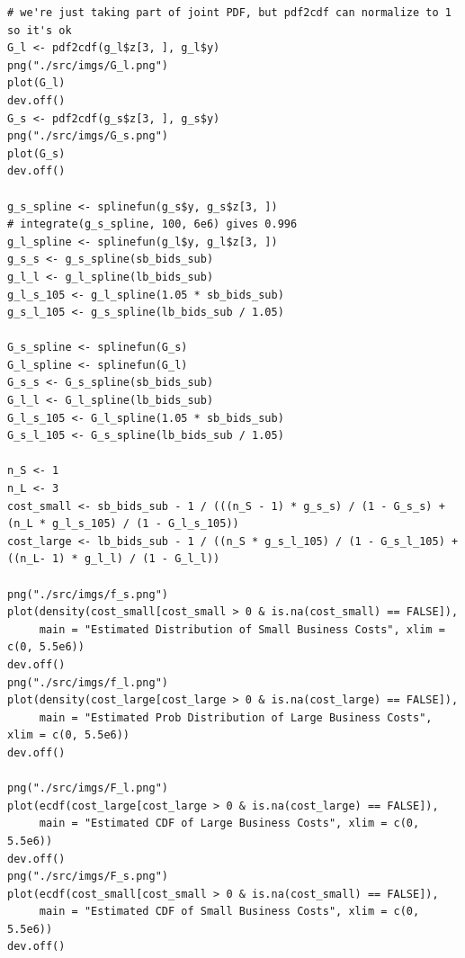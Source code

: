 \begin{lstlisting}
# we're just taking part of joint PDF, but pdf2cdf can normalize to 1 so it's ok
G_l <- pdf2cdf(g_l$z[3, ], g_l$y)
png("./src/imgs/G_l.png")
plot(G_l)
dev.off()
G_s <- pdf2cdf(g_s$z[3, ], g_s$y)
png("./src/imgs/G_s.png")
plot(G_s)
dev.off()

g_s_spline <- splinefun(g_s$y, g_s$z[3, ])
# integrate(g_s_spline, 100, 6e6) gives 0.996
g_l_spline <- splinefun(g_l$y, g_l$z[3, ])
g_s_s <- g_s_spline(sb_bids_sub)
g_l_l <- g_l_spline(lb_bids_sub)
g_l_s_105 <- g_l_spline(1.05 * sb_bids_sub)
g_s_l_105 <- g_s_spline(lb_bids_sub / 1.05)

G_s_spline <- splinefun(G_s)
G_l_spline <- splinefun(G_l)
G_s_s <- G_s_spline(sb_bids_sub)
G_l_l <- G_l_spline(lb_bids_sub)
G_l_s_105 <- G_l_spline(1.05 * sb_bids_sub)
G_s_l_105 <- G_s_spline(lb_bids_sub / 1.05)

n_S <- 1
n_L <- 3
cost_small <- sb_bids_sub - 1 / (((n_S - 1) * g_s_s) / (1 - G_s_s) + (n_L * g_l_s_105) / (1 - G_l_s_105))
cost_large <- lb_bids_sub - 1 / ((n_S * g_s_l_105) / (1 - G_s_l_105) + ((n_L- 1) * g_l_l) / (1 - G_l_l))

png("./src/imgs/f_s.png")
plot(density(cost_small[cost_small > 0 & is.na(cost_small) == FALSE]),
     main = "Estimated Distribution of Small Business Costs", xlim = c(0, 5.5e6))
dev.off()
png("./src/imgs/f_l.png")
plot(density(cost_large[cost_large > 0 & is.na(cost_large) == FALSE]),
     main = "Estimated Prob Distribution of Large Business Costs", xlim = c(0, 5.5e6))
dev.off()

png("./src/imgs/F_l.png")
plot(ecdf(cost_large[cost_large > 0 & is.na(cost_large) == FALSE]),
     main = "Estimated CDF of Large Business Costs", xlim = c(0, 5.5e6))
dev.off()
png("./src/imgs/F_s.png")
plot(ecdf(cost_small[cost_small > 0 & is.na(cost_small) == FALSE]),
     main = "Estimated CDF of Small Business Costs", xlim = c(0, 5.5e6))
dev.off()
\end{lstlisting}
